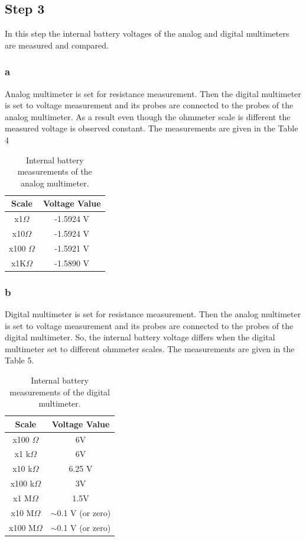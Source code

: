 \documentclass[letterpaper,12pt]{article}
\begin{document}
\subsection{Step 3}
In this step the internal battery voltages of the analog and digital multimeters are measured and compared.
\subsubsection{a}
Analog multimeter is set for resistance measurement. Then the digital multimeter is set to voltage measurement and its probes are connected to the probes of the analog multimeter. As a result even though the ohmmeter scale is different the measured voltage is observed constant. The measurements are given in the Table 4
\begin{table}[H]
	\begin{center}
		
	
	\begin{tabular}{|| c | c ||}
	\hline
	Scale              & Voltage Value \\[0.5ex] 
	\hline\hline
	x1\( \Omega \)   & -1.5924 V     \\
	\hline
	x10\( \Omega \)  & -1.5924 V     \\
	\hline
	x100 \( \Omega \) & -1.5921 V     \\
	\hline
	x1K\( \Omega \)  & -1.5890 V   \\
	\hline
	\end{tabular}
	\caption{Internal battery measurements of the analog multimeter.}
\end{center}
\end{table}

\subsubsection{b}
Digital multimeter is set for resistance measurement. Then the analog multimeter is set to voltage measurement and its probes are connected to the probes of the digital multimeter. So, the internal battery voltage differs when the digital multimeter set to different ohmmeter scales. The measurements are given in the Table 5.
\begin{table}[H]
	\centering
	\begin{tabular}{|| c | c ||}
		\hline
	Scale & Voltage Value \\\hline
	\hline
	x100 \( \Omega \) & 6V \\\hline
	x1 k\( \Omega \) & 6V \\\hline
	x10 k\( \Omega \) & 6.25 V \\\hline
	x100 k\( \Omega \) & 3V \\\hline
	x1 M\( \Omega \) & 1.5V \\\hline
	x10 M\( \Omega \) & $\sim$0.1 V (or zero) \\\hline
	x100 M\( \Omega \) & $\sim$0.1 V (or zero) \\\hline
	\end{tabular}
	\caption{Internal battery measurements of the digital multimeter.}
\end{table}
\end{document}
